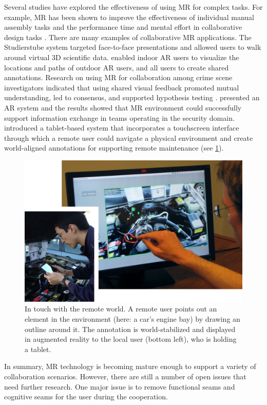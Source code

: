 Several studies have explored the effectiveness of using MR for complex tasks. For example, MR has been shown to improve the effectiveness of individual manual assembly tasks \cite{Baird1999} and the performance time and mental effort in collaborative design tasks \cite{Wang2011}. 
There are many examples of collaborative MR applications. The Studierstube system \cite{Szalavri1998} targeted face-to-face presentations and allowed users to walk around virtual 3D scientific data. \citet{Hollerer1999} enabled indoor AR users to visualize the locations and paths of outdoor AR users, and all users to create shared annotations.
Research on using MR for collaboration among crime scene investigators indicated that using shared visual feedback promoted mutual understanding, led to consensus, and supported hypothesis testing \cite{Poelman2012}. 
\citet{Datcu2014} presented an AR system and the results showed that MR environment could successfully support information exchange in teams operating in the security domain.
\citet{Gauglitz2014} introduced a tablet-based system that incorporates a touchscreen interface through which a remote user could navigate a physical environment and create world-aligned annotations for supporting remote maintenance (see \figurename{\ref{fig:2-bg:drawingsandvirtualnavigation}}). 
\begin{figure}
	\centering
	\includegraphics[width=0.8\linewidth]{"figures/2-bg/drawings and virtual navigation"}
	\caption{In touch with the remote world. A remote user points out an element in the environment (here: a car's engine bay) by drawing an outline around it. The annotation is world-stabilized and displayed in augmented reality to the local user (bottom left), who is holding a tablet.}
	\label{fig:2-bg:drawingsandvirtualnavigation}
\end{figure}
In summary, MR technology is becoming mature enough to support a variety of collaboration scenarios. However, there are still a number of open issues that need further research. One major issue is to remove functional seams and cognitive seams for the user during the cooperation.

